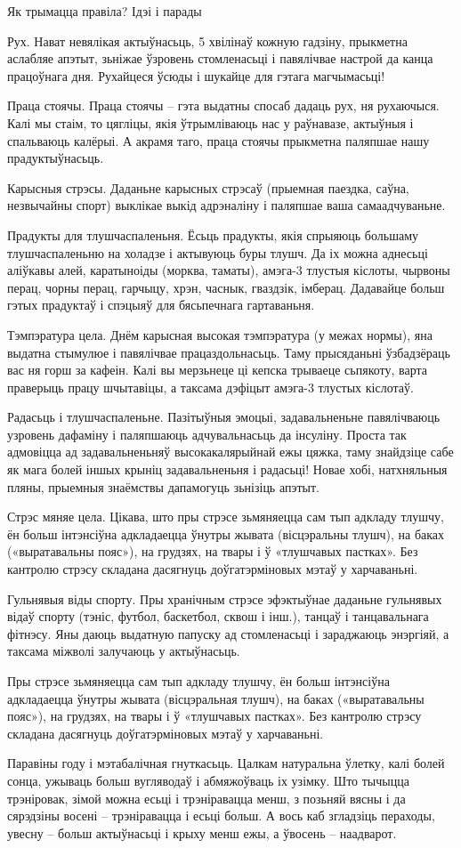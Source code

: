 Як трымацца правіла? Ідэі і парады

Рух.
Нават невялікая актыўнасьць, 5 хвілінаў кожную гадзіну, прыкметна аслабляе апэтыт, зьніжае ўзровень стомленасьці і павялічвае настрой да канца працоўнага дня. Рухайцеся ўсюды і шукайце для гэтага магчымасьці!

Праца стоячы.
Праца стоячы – гэта выдатны спосаб дадаць рух, ня рухаючыся. Калі мы стаім, то цягліцы, якія ўтрымліваюць нас у раўнавазе, актыўныя і спальваюць калёрыі. А акрамя таго, праца стоячы прыкметна паляпшае нашу прадуктыўнасьць.

Карысныя стрэсы.
Даданьне карысных стрэсаў (прыемная паездка, саўна, незвычайны спорт) выклікае выкід адрэналіну і паляпшае ваша самаадчуваньне.

Прадукты для тлушчаспаленьня.
Ёсьць прадукты, якія спрыяюць большаму тлушчаспаленьню на холадзе і актывуюць буры тлушч. Да іх можна аднесьці аліўкавы алей, каратыноіды (морква, таматы), амэга-3 тлустыя кіслоты, чырвоны перац, чорны перац, гарчыцу, хрэн, часнык, гваздзік, імберац. Дадавайце больш гэтых прадуктаў і спэцыяў для бясьпечнага гартаваньня.

Тэмпэратура цела.
Днём карысная высокая тэмпэратура (у межах нормы), яна выдатна стымулюе і павялічвае працаздольнасьць. Таму прысяданьні ўзбадзёраць вас ня горш за кафеін. Калі вы мерзьнеце ці кепска трываеце сьпякоту, варта праверыць працу шчытавіцы, а таксама дэфіцыт амэга-3 тлустых кіслотаў.

Радасьць і тлушчаспаленьне.
Пазітыўныя эмоцыі, задавальненьне павялічваюць узровень дафаміну і паляпшаюць адчувальнасьць да інсуліну. Проста так адмовіцца ад задавальненьняў высокакалярыйнай ежы цяжка, таму знайдзіце сабе як мага болей іншых крыніц задавальненьня і радасьці! Новае хобі, натхняльныя пляны, прыемныя знаёмствы дапамогуць зьнізіць апэтыт.

Стрэс мяняе цела.
Цікава, што пры стрэсе зьмяняецца сам тып адкладу тлушчу, ён больш інтэнсіўна адкладаецца ўнутры жывата (вісцэральны тлушч), на баках («выратавальны пояс»), на грудзях, на твары і ў «тлушчавых пастках». Без кантролю стрэсу складана дасягнуць доўгатэрміновых мэтаў у харчаваньні.

Гульнявыя віды спорту.
Пры хранічным стрэсе эфэктыўнае даданьне гульнявых відаў спорту (тэніс, футбол, баскетбол, сквош і інш.), танцаў і танцавальнага фітнэсу. Яны даюць выдатную папуску ад стомленасьці і зараджаюць энэргіяй, а таксама міжволі залучаюць у актыўнасьць.

Пры стрэсе зьмяняецца сам тып адкладу тлушчу, ён больш інтэнсіўна адкладаецца ўнутры жывата (вісцэральная тлушч), на баках («выратавальны пояс»), на грудзях, на твары і ў «тлушчавых пастках». Без кантролю стрэсу складана дасягнуць доўгатэрміновых мэтаў у харчаваньні.

Паравіны году і мэтабалічная гнуткасьць.
Цалкам натуральна ўлетку, калі болей сонца, ужываць больш вугляводаў і абмяжоўваць іх узімку. Што тычыцца трэніровак, зімой можна есьці і трэніравацца менш, з позьняй вясны і да сярэдзіны восені – трэніравацца і есьці больш. А вось каб згладзіць пераходы, увесну – больш актыўнасьці і крыху менш ежы, а ўвосень – наадварот.
